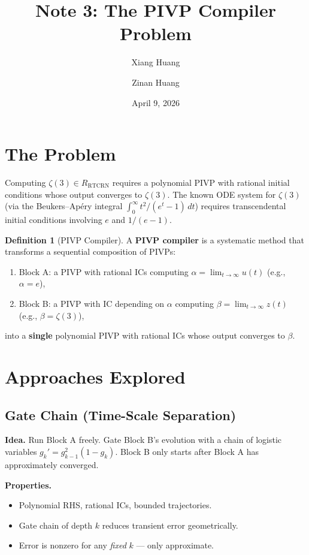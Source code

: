 \documentclass[11pt]{article}
\title{Note 3: The PIVP Compiler Problem}
\author{Xiang Huang \and Zinan Huang}
\date{April 9, 2026}
\theoremstyle{definition}
\newtheorem{definition}{Definition}
\theoremstyle{remark}
\begin{document}
\maketitle

\section{The Problem}

Computing $\zeta(3) \in R_{\mathrm{RTCRN}}$ requires a polynomial PIVP with rational initial conditions whose output converges to $\zeta(3)$. The known ODE system for $\zeta(3)$ (via the Beukers--Apéry integral $\int_0^\infty t^2/(e^t-1)\,dt$) requires transcendental initial conditions involving $e$ and $1/(e-1)$.

\begin{definition}[PIVP Compiler]
A \textbf{PIVP compiler} is a systematic method that transforms a sequential composition of PIVPs:
\begin{enumerate}
  \item Block A: a PIVP with rational ICs computing $\alpha = \lim_{t\to\infty} u(t)$ (e.g., $\alpha = e$),
  \item Block B: a PIVP with IC depending on $\alpha$ computing $\beta = \lim_{t\to\infty} z(t)$ (e.g., $\beta = \zeta(3)$),
\end{enumerate}
into a \textbf{single} polynomial PIVP with rational ICs whose output converges to $\beta$.
\end{definition}

\section{Approaches Explored}

\subsection{Gate Chain (Time-Scale Separation)}

\textbf{Idea.} Run Block A freely. Gate Block B's evolution with a chain of logistic variables $g_k' = g_{k-1}^2(1-g_k)$. Block B only starts after Block A has approximately converged.

\textbf{Properties.}
\begin{itemize}
  \item Polynomial RHS, rational ICs, bounded trajectories. \checkmark
  \item Gate chain of depth $k$ reduces transient error geometrically. \checkmark
  \item Error is nonzero for any \emph{fixed} $k$ --- only approximate. 
\end{itemize}
\end{document}
